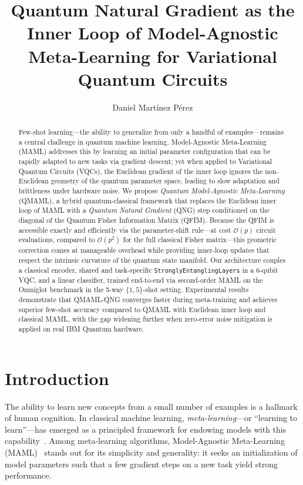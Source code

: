 \documentclass[a4paper,nopdfoutputerror]{quantumarticle}
\title{Quantum Natural Gradient as the Inner Loop of Model-Agnostic Meta-Learning
for Variational Quantum Circuits}
\author{Daniel Mart\'inez P\'erez}
\affiliation{Quantum Machine Learning Group, Universidad Pablo de Olavide, Sevilla, Spain}
\begin{document}
\maketitle

\begin{abstract}
Few-shot learning---the ability to generalize from only a handful of
examples---remains a central challenge in quantum machine learning.
Model-Agnostic Meta-Learning (MAML) addresses this by learning an initial
parameter configuration that can be rapidly adapted to new tasks via gradient
descent; yet when applied to Variational Quantum Circuits (VQCs), the
Euclidean gradient of the inner loop ignores the non-Euclidean geometry of
the quantum parameter space, leading to slow adaptation and brittleness under
hardware noise.
We propose \emph{Quantum Model-Agnostic Meta-Learning} (QMAML), a hybrid
quantum-classical framework that replaces the Euclidean inner loop of MAML
with a \emph{Quantum Natural Gradient} (QNG) step conditioned on the diagonal
of the Quantum Fisher Information Matrix (QFIM).
Because the QFIM is accessible exactly and efficiently via the parameter-shift
rule---at cost $\mathcal{O}(p)$ circuit evaluations, compared to
$\mathcal{O}(p^2)$ for the full classical Fisher matrix---this
geometric correction comes at manageable overhead while providing inner-loop
updates that respect the intrinsic curvature of the quantum state manifold.
Our architecture couples a classical encoder, shared and task-specific
\texttt{StronglyEntanglingLayers} in a 6-qubit VQC, and a linear classifier,
trained end-to-end via second-order MAML on the Omniglot benchmark in the
5-way $\{1,5\}$-shot setting.
Experimental results demonstrate that QMAML-QNG converges faster during
meta-training and achieves superior few-shot accuracy compared to
QMAML with Euclidean inner loop and classical MAML, with the gap widening
further when zero-error noise mitigation is applied on real IBM Quantum hardware.
\end{abstract}


\section{Introduction}
\label{sec:intro}

The ability to learn new concepts from a small number of examples is a
hallmark of human cognition.
In classical machine learning, \emph{meta-learning}---or ``learning to
learn''---has emerged as a principled framework for endowing models with this
capability~\cite{finn2017maml,vinyals2016matching,snell2017prototypical}.
Among meta-learning algorithms, Model-Agnostic Meta-Learning
(MAML)~\cite{finn2017maml} stands out for its simplicity and generality: it
seeks an initialization of model parameters such that a few gradient steps on
a new task yield strong performance.
\end{document}
